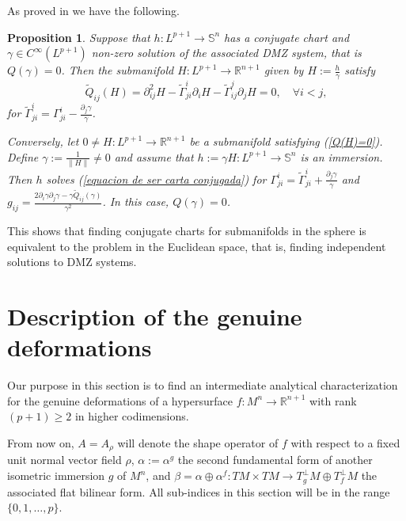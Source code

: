 \documentclass{article}
\newtheorem{prop}[thm]{Proposition}
\theoremstyle{remark}
\begin{document}
As proved in \cite{KT} we have the following.
\begin{prop}\label{carta conjugada esfera=carta conjugada euclideano}
    Suppose that $h:L^{p+1}\rightarrow\mathbb{S}^n$ has a conjugate chart and $\gamma\in C^{\infty}(L^{p+1})$ non-zero solution of the associated DMZ system, that is $Q(\gamma)=0$. Then the submanifold $H:L^{p+1}\rightarrow\mathbb{R}^{n+1}$ given by $H:=\frac{h}{\gamma}$ satisfy
    \begin{equation}\label{Q(H)=0}
        \tilde{Q}_{ij}(H)=\partial^2_{ij}H-\tilde{\Gamma}^i_{ji}\partial_iH-\tilde{\Gamma}^j_{ij}\partial_jH=0,\quad\forall i<j,
    \end{equation}
    for $\tilde{\Gamma}^i_{ji}=\Gamma^i_{ji}-\frac{\partial_j\gamma}{\gamma}$.
    
    Conversely, let $0\neq H:L^{p+1}\rightarrow\mathbb{R}^{n+1}$ be a submanifold satisfying (\ref{Q(H)=0}). Define $\gamma:=\frac{1}{\|H\|}\neq 0$ and assume that $h:=\gamma H:L^{p+1}\rightarrow\mathbb{S}^{n}$ is an immersion. Then $h$ solves (\ref{equacion de ser carta conjugada}) for $\Gamma_{ji}^i=\tilde{\Gamma}_{ji}^i+\frac{\partial_j\gamma}{\gamma}$ and $g_{ij}=\frac{2\partial_i\gamma\partial_j\gamma-\gamma\tilde{Q}_{ij}(\gamma)}{\gamma^2}$. In this case, $Q(\gamma)=0$.
\end{prop}

This shows that finding conjugate charts for submanifolds in the sphere is equivalent to the problem in the Euclidean space, that is, finding independent solutions to DMZ systems.

\section{Description of the genuine deformations}\label{seccion descripcion del problema}
Our purpose in this section is to find an intermediate analytical characterization for the genuine deformations of a hypersurface $f:M^n\rightarrow\mathbb{R}^{n+1}$ with rank $(p+1)\geq 2$ in higher codimensions. 

\text{ }

From now on, $A=A_\rho$ will denote the shape operator of $f$ with respect to a fixed unit normal vector field $\rho$, $\alpha:=\alpha^g$ the second fundamental form of another isometric immersion $g$ of $M^n$, and $\beta=\alpha\oplus\alpha^f:TM\times TM\rightarrow T^\perp _gM\oplus T^\perp _fM$ the associated flat bilinear form. All sub-indices in this section will be in the range $\{0,1,\ldots,p\}$.
\end{document}
